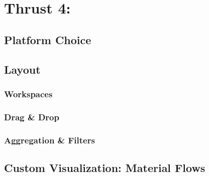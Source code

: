 \chapter{Thrust 4: }\label{chap:thrust4}

\section{Platform Choice}

\section{Layout}

\subsection{Workspaces}

\subsection{Drag \& Drop}

\subsection{Aggregation \& Filters}

\section{Custom Visualization: Material Flows}
